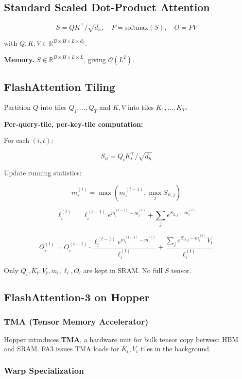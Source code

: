 \subsection{Standard Scaled Dot-Product Attention}

\[
S = Q K^\top / \sqrt{d_h}, \quad P = \text{softmax}(S), \quad O = P V
\tag{3.1}
\]

with $Q, K, V \in \mathbb{R}^{B \times H \times L \times d_h}$.

\textbf{Memory.} $S \in \mathbb{R}^{B \times H \times L \times L}$, giving 
$\mathcal{O}(L^2)$.

\subsection{FlashAttention Tiling}

Partition $Q$ into tiles $Q_1, \ldots, Q_T$ and $K, V$ into tiles 
$K_1, \ldots, K_T$.

\textbf{Per-query-tile, per-key-tile computation:}

For each $(i, t)$:

\[
S_{it} = Q_i K_t^\top / \sqrt{d_h}
\tag{3.2}
\]

Update running statistics:

\[
m_i^{(t)} = \max(m_i^{(t-1)}, \max_j S_{it, j})
\tag{3.3}
\]

\[
\ell_i^{(t)} = \ell_i^{(t-1)} e^{m_i^{(t-1)} - m_i^{(t)}} + \sum_j e^{S_{it, j} - m_i^{(t)}}
\tag{3.4}
\]

\[
O_i^{(t)} = O_i^{(t-1)} \cdot \frac{\ell_i^{(t-1)} e^{m_i^{(t-1)} - m_i^{(t)}}}{\ell_i^{(t)}} + \frac{\sum_j e^{S_{it, j} - m_i^{(t)}} V_t}{\ell_i^{(t)}}
\tag{3.5}
\]

Only $Q_i, K_t, V_t, m_i, \ell_i, O_i$ are kept in SRAM. No full $S$ tensor.

\subsection{FlashAttention-3 on Hopper}

\subsubsection{TMA (Tensor Memory Accelerator)}

Hopper introduces \textbf{TMA}, a hardware unit for bulk tensor copy between HBM 
and SRAM. FA3 issues TMA loads for $K_t, V_t$ tiles in the background.

\subsubsection{Warp Specialization}

